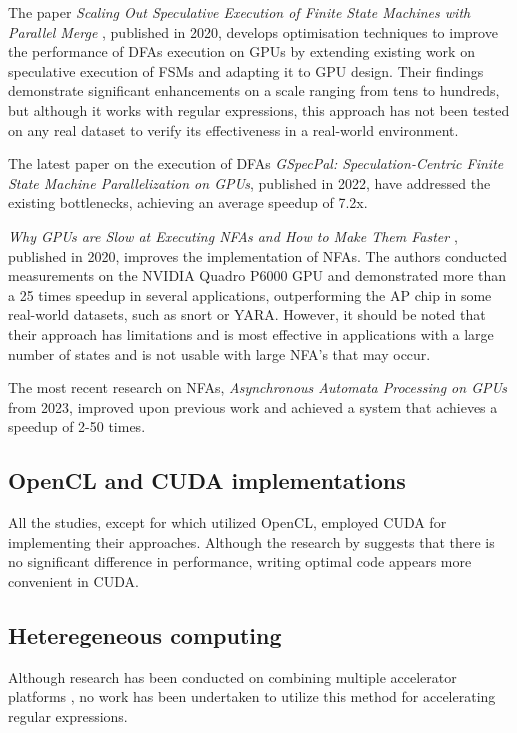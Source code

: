 \documentclass[10pt,onecolumn,twoside,english,a4paper]{article}
\begin{document}
The paper \textit{Scaling Out Speculative Execution of Finite State Machines with Parallel Merge} \cite{Xia:FSA-scaling}, published in 2020, develops optimisation techniques to improve the performance of DFAs execution on GPUs by extending existing work on speculative execution of FSMs and adapting it to GPU design. Their findings demonstrate significant enhancements on a scale ranging from tens to hundreds, but although it works with regular expressions, this approach has not been tested on any real dataset to verify its effectiveness in a real-world environment.

The latest paper on the execution of DFAs \textit{GSpecPal: Speculation-Centric Finite State Machine Parallelization on GPUs}\cite{wang2022gspecpal}, published in 2022, have addressed the existing bottlenecks, achieving an average speedup of 7.2x.

\textit{Why GPUs are Slow at Executing NFAs and How to Make Them Faster} \cite{Liu:WhyGPUSlowNFA}, published in 2020, improves the implementation of NFAs. The authors conducted measurements on the NVIDIA Quadro P6000 GPU and demonstrated more than a 25 times speedup in several applications, outperforming the AP chip in some real-world datasets, such as snort or YARA. However, it should be noted that their approach has limitations and is most effective in applications with a large number of states and is not usable with large NFA's that may occur.

The most recent research on NFAs, \textit{Asynchronous Automata Processing on GPUs}\cite{Liu:Asynchronous} from 2023, improved upon previous work and achieved a system that achieves a speedup of 2-50 times.

\subsection{OpenCL and CUDA implementations} \label{OpenCL and CUDA implementations}
All the studies, except for \cite{rosciszewski2014regular} which utilized OpenCL, employed CUDA for implementing their approaches. Although the research by \cite{Fang:Comparison-cuda-opencl} suggests that there is no significant difference in performance, writing optimal code appears more convenient in CUDA.

\subsection{Heteregeneous computing} \label{Heteregeneous computing}
Although research has been conducted on combining multiple accelerator platforms \cite{kobayashi2019gpu}, no work has been undertaken to utilize this method for accelerating regular expressions.
\end{document}
